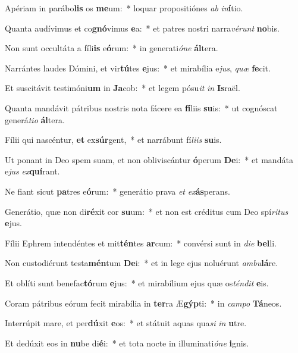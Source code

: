 \item Apériam in parábo\textbf{lis} os \textbf{me}um:~* loquar propositiónes \textit{ab} \textit{in}\textbf{í}tio.
\item Quanta audívimus et co\textbf{gnó}vimus \textbf{e}a:~* et patres nostri narra\textit{vé}\textit{runt} \textbf{no}bis.
\item Non sunt occultáta a fíli\textbf{is} e\textbf{ó}rum:~* in generati\textit{ó}\textit{ne} \textbf{ál}tera.
\item Narrántes laudes Dómini, et vir\textbf{tú}tes \textbf{e}jus:~* et mirabília e\textit{jus}, \textit{quæ} \textbf{fe}cit.
\item Et suscitávit testimóni\textbf{um} in \textbf{Ja}cob:~* et legem pósu\textit{it} \textit{in} \textbf{Is}raël.
\item Quanta mandávit pátribus nostris nota fácere ea \textbf{fí}liis \textbf{su}is:~* ut cognóscat generá\textit{ti}\textit{o} \textbf{ál}tera.
\item Fílii qui nascéntur, \textbf{et} ex\textbf{súr}gent,~* et narrábunt fí\textit{li}\textit{is} \textbf{su}is.
\item Ut ponant in Deo spem suam, et non obliviscántur \textbf{ó}perum \textbf{De}i:~* et mandáta e\textit{jus} \textit{ex}\textbf{quí}rant.
\item Ne fiant sicut \textbf{pa}tres e\textbf{ó}rum:~* generátio prava \textit{et} \textit{ex}\textbf{ás}perans.
\item Generátio, quæ non di\textbf{ré}xit cor \textbf{su}um:~* et non est créditus cum Deo spí\textit{ri}\textit{tus} \textbf{e}jus.
\item Fílii Ephrem intendéntes et mit\textbf{tén}tes \textbf{ar}cum:~* convérsi sunt in \textit{di}\textit{e} \textbf{bel}li.
\item Non custodiérunt testa\textbf{mén}tum \textbf{De}i:~* et in lege ejus noluérunt \textit{am}\textit{bu}\textbf{lá}re.
\item Et oblíti sunt benefac\textbf{tó}rum \textbf{e}jus:~* et mirabílium ejus quæ os\textit{tén}\textit{dit} \textbf{e}is.
\item Coram pátribus eórum fecit mirabília in \textbf{ter}ra Æ\textbf{gýp}ti:~* in \textit{cam}\textit{po} \textbf{Tá}neos.
\item Interrúpit mare, et per\textbf{dú}xit \textbf{e}os:~* et státuit aquas qua\textit{si} \textit{in} \textbf{u}tre.
\item Et dedúxit eos in \textbf{nu}be di\textbf{é}i:~* et tota nocte in illuminati\textit{ó}\textit{ne} \textbf{i}gnis.
